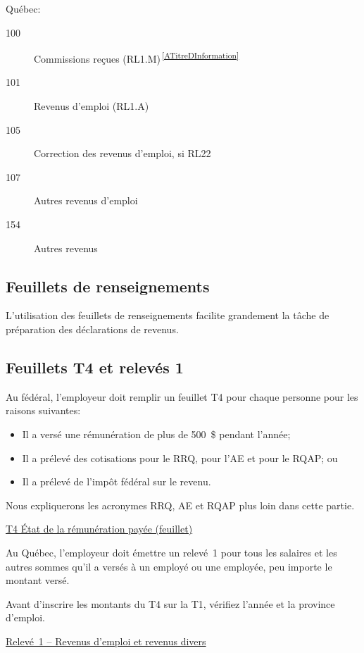Québec:
\qc
\begin{description}
	\item[100] Commissions reçues (RL1.M)\textsuperscript{\,\ref{ATitreDInformation}}
	\item[101] Revenus d'emploi (RL1.A)
	\item[105] Correction des revenus d'emploi, si RL22
	\item[107] Autres revenus d'emploi
	\item[154] Autres revenus
\end{description}


\subsection{Feuillets de renseignements}
L'utilisation des feuillets de renseignements facilite grandement la tâche de préparation des déclarations de revenus.


\subsection{Feuillets T4 et relevés 1}
Au fédéral, l'employeur doit remplir un feuillet T4 pour chaque personne pour les raisons suivantes:
\begin{itemize}
	\item Il a versé une rémunération de plus de 500~\$ pendant l'année;
	\item Il a prélevé des cotisations pour le RRQ, pour l'AE et pour le RQAP; ou
	\item Il a prélevé de l'impôt fédéral sur le revenu.
\end{itemize}

\begin{note}
	Nous expliquerons les acronymes RRQ, AE et RQAP plus loin dans cette partie.
\end{note}
\cat\href{https://www.canada.ca/fr/agence-revenu/services/formulaires-publications/formulaires/t4.html}{T4 État de la rémunération payée (feuillet)}

Au Québec, l'employeur doit émettre un relevé~1 pour tous les salaires et les autres sommes qu'il a versés à un employé ou une employée, peu importe le montant versé.

\begin{note}
	Avant d'inscrire les montants du T4 sur la T1, vérifiez l'année et la province d'emploi.
\end{note}
\qct\href{https://www.revenuquebec.ca/fr/services-en-ligne/formulaires-et-publications/details-courant/rl-1/}{Relevé~1 – Revenus d'emploi et revenus divers }


